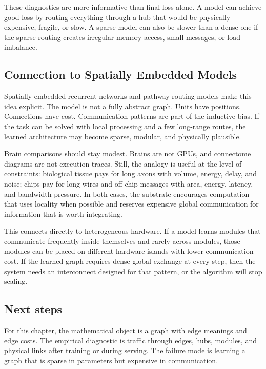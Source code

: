 These diagnostics are more informative than final loss alone. A model can achieve good loss by routing everything through a hub that would be physically expensive, fragile, or slow. A sparse model can also be slower than a dense one if the sparse routing creates irregular memory access, small messages, or load imbalance.

\subsection{Connection to Spatially Embedded Models}

Spatially embedded recurrent networks and pathway-routing models make this idea explicit. The model is not a fully abstract graph. Units have positions. Connections have cost. Communication patterns are part of the inductive bias. If the task can be solved with local processing and a few long-range routes, the learned architecture may become sparse, modular, and physically plausible.

Brain comparisons should stay modest. Brains are not GPUs, and connectome diagrams are not execution traces. Still, the analogy is useful at the level of constraints: biological tissue pays for long axons with volume, energy, delay, and noise; chips pay for long wires and off-chip messages with area, energy, latency, and bandwidth pressure. In both cases, the substrate encourages computation that uses locality when possible and reserves expensive global communication for information that is worth integrating.

This connects directly to heterogeneous hardware. If a model learns modules that communicate frequently inside themselves and rarely across modules, those modules can be placed on different hardware islands with lower communication cost. If the learned graph requires dense global exchange at every step, then the system needs an interconnect designed for that pattern, or the algorithm will stop scaling.

\subsection{Next steps}

For this chapter, the mathematical object is a graph with edge meanings and edge costs. The empirical diagnostic is traffic through edges, hubs, modules, and physical links after training or during serving. The failure mode is learning a graph that is sparse in parameters but expensive in communication.

